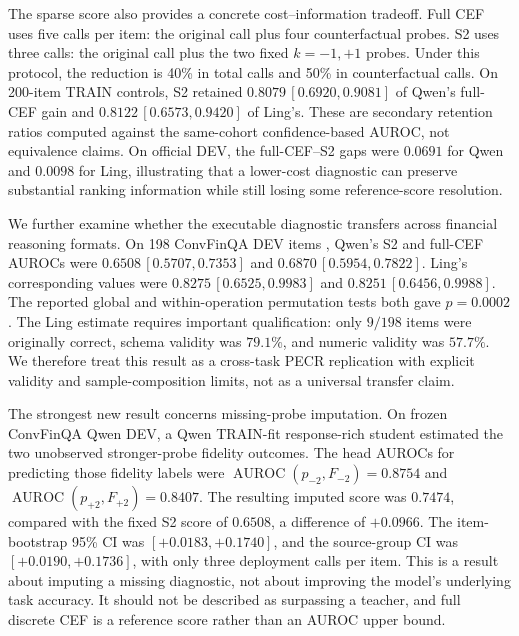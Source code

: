 \documentclass[11pt]{article}
\begin{document}
The sparse score also provides a concrete cost--information tradeoff. Full CEF uses five calls per item: the original call plus four counterfactual probes. S2 uses three calls: the original call plus the two fixed \(k=-1,+1\) probes. Under this protocol, the reduction is 40\% in total calls and 50\% in counterfactual calls. On 200-item TRAIN controls, S2 retained \(0.8079\,[0.6920,0.9081]\) of Qwen's full-CEF gain and \(0.8122\,[0.6573,0.9420]\) of Ling's. These are secondary retention ratios computed against the same-cohort confidence-based AUROC, not equivalence claims. On official DEV, the full-CEF--S2 gaps were \(0.0691\) for Qwen and \(0.0098\) for Ling, illustrating that a lower-cost diagnostic can preserve substantial ranking information while still losing some reference-score resolution.

We further examine whether the executable diagnostic transfers across financial reasoning formats. On 198 ConvFinQA DEV items \citep{chen-etal-2022-convfinqa}, Qwen's S2 and full-CEF AUROCs were \(0.6508\,[0.5707,0.7353]\) and \(0.6870\,[0.5954,0.7822]\). Ling's corresponding values were \(0.8275\,[0.6525,0.9983]\) and \(0.8251\,[0.6456,0.9988]\). The reported global and within-operation permutation tests both gave \(p=0.0002\). The Ling estimate requires important qualification: only \(9/198\) items were originally correct, schema validity was \(79.1\%\), and numeric validity was \(57.7\%\). We therefore treat this result as a cross-task PECR replication with explicit validity and sample-composition limits, not as a universal transfer claim.

The strongest new result concerns missing-probe imputation. On frozen ConvFinQA Qwen DEV, a Qwen TRAIN-fit response-rich student estimated the two unobserved stronger-probe fidelity outcomes. The head AUROCs for predicting those fidelity labels were \(\operatorname{AUROC}(p_{-2},F_{-2})=0.8754\) and \(\operatorname{AUROC}(p_{+2},F_{+2})=0.8407\). The resulting imputed score was \(0.7474\), compared with the fixed S2 score of \(0.6508\), a difference of \(+0.0966\). The item-bootstrap 95\% CI was \([+0.0183,+0.1740]\), and the source-group CI was \([+0.0190,+0.1736]\), with only three deployment calls per item. This is a result about imputing a missing diagnostic, not about improving the model's underlying task accuracy. It should not be described as surpassing a teacher, and full discrete CEF is a reference score rather than an AUROC upper bound.
\end{document}

